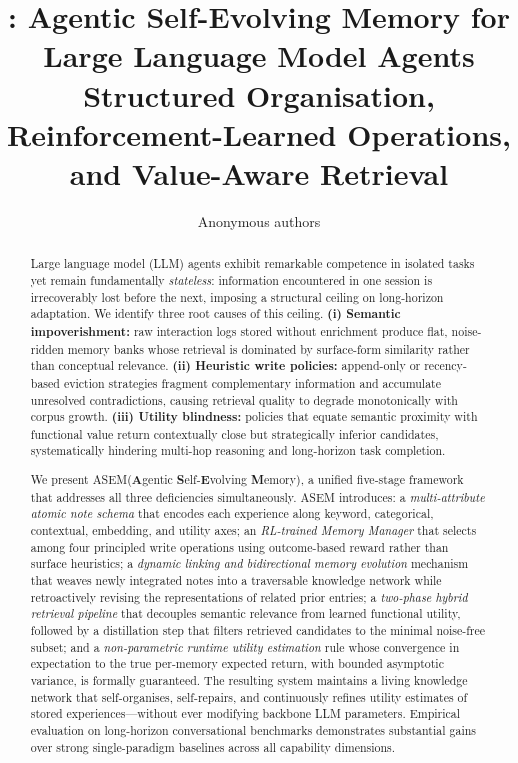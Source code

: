 \documentclass{article}
\title{\ours: Agentic Self-Evolving Memory for Large Language Model Agents\\
\large Structured Organisation, Reinforcement-Learned Operations, and Value-Aware Retrieval}
\author{Anonymous authors}
\newcommand{\ours}{\textsc{ASEM}\xspace}
\begin{document}
\maketitle

\begin{abstract}
Large language model (LLM) agents exhibit remarkable competence in isolated
tasks yet remain fundamentally \emph{stateless}: information encountered in
one session is irrecoverably lost before the next, imposing a structural
ceiling on long-horizon adaptation.
We identify three root causes of this ceiling.
\textbf{(i) Semantic impoverishment:} raw interaction logs stored without
enrichment produce flat, noise-ridden memory banks whose retrieval is
dominated by surface-form similarity rather than conceptual relevance.
\textbf{(ii) Heuristic write policies:} append-only or recency-based eviction
strategies fragment complementary information and accumulate unresolved
contradictions, causing retrieval quality to degrade monotonically with
corpus growth.
\textbf{(iii) Utility blindness:} policies that equate semantic proximity with
functional value return contextually close but strategically inferior
candidates, systematically hindering multi-hop reasoning and long-horizon task
completion.

We present \ours (\textbf{A}gentic \textbf{S}elf-\textbf{E}volving
\textbf{M}emory), a unified five-stage framework that addresses all three
deficiencies simultaneously.
\ours introduces: a \emph{multi-attribute atomic note schema} that encodes
each experience along keyword, categorical, contextual, embedding, and utility
axes; an \emph{RL-trained Memory Manager} that selects among four principled
write operations using outcome-based reward rather than surface heuristics;
a \emph{dynamic linking and bidirectional memory evolution} mechanism that
weaves newly integrated notes into a traversable knowledge network while
retroactively revising the representations of related prior entries; a
\emph{two-phase hybrid retrieval pipeline} that decouples semantic relevance
from learned functional utility, followed by a distillation step that filters
retrieved candidates to the minimal noise-free subset; and a
\emph{non-parametric runtime utility estimation} rule whose convergence in
expectation to the true per-memory expected return, with bounded asymptotic
variance, is formally guaranteed.
The resulting system maintains a living knowledge network that
self-organises, self-repairs, and continuously refines utility estimates of
stored experiences---without ever modifying backbone LLM parameters.
Empirical evaluation on long-horizon conversational benchmarks demonstrates
substantial gains over strong single-paradigm baselines across all
capability dimensions.
\end{abstract}
\end{document}
